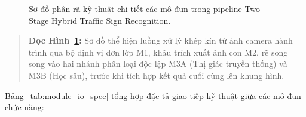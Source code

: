 \documentclass[a4paper, 11pt]{article}
\begin{document}
\begin{figure}[H]
{%
}
\caption{Sơ đồ phân rã kỹ thuật chi tiết các mô-đun trong pipeline Two-Stage Hybrid Traffic Sign Recognition.}
\label{fig:detailed_pipeline_block}
\end{figure}
\vspace{-0.2cm}
\begin{quote}
\small \textbf{Đọc Hình~\ref{fig:detailed_pipeline_block}:} Sơ đồ thể hiện luồng xử lý khép kín từ ảnh camera hành trình qua bộ định vị đơn lớp M1, khâu trích xuất ảnh con M2, rẽ song song vào hai nhánh phân loại độc lập M3A (Thị giác truyền thống) và M3B (Học sâu), trước khi tích hợp kết quả cuối cùng lên khung hình.
\end{quote}

Bảng~\ref{tab:module_io_spec} tổng hợp đặc tả giao tiếp kỹ thuật giữa các mô-đun chức năng:
\end{document}
